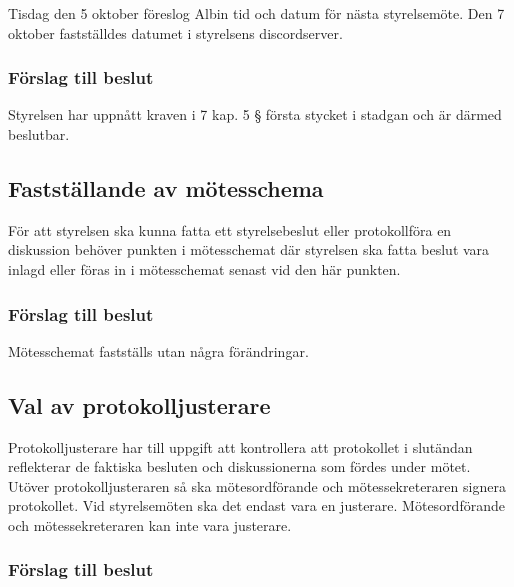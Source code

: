 \documentclass[protokoll]{dvd}
\begin{document}
Tisdag den 5 oktober föreslog Albin tid och datum för nästa styrelsemöte.
Den 7 oktober fastställdes datumet i styrelsens discordserver.

\subsubsection*{Förslag till beslut}

\begin{attsatser}
    \item Styrelsen har uppnått kraven i 7 kap. 5 § första stycket i stadgan och är därmed beslutbar.
\end{attsatser}




\subsection{Fastställande av mötesschema}

För att styrelsen ska kunna fatta ett styrelsebeslut eller protokollföra en diskussion behöver punkten i mötesschemat där styrelsen ska fatta beslut vara inlagd eller föras in i mötesschemat senast vid den här punkten.

\subsubsection*{Förslag till beslut}

\begin{attsatser}
    \item Mötesschemat fastställs utan några förändringar.
\end{attsatser}





\subsection{Val av protokolljusterare}

Protokolljusterare har till uppgift att kontrollera att protokollet i slutändan reflekterar de faktiska besluten och diskussionerna som fördes under mötet.
Utöver protokolljusteraren så ska mötesordförande och mötessekreteraren signera protokollet.
Vid styrelsemöten ska det endast vara en justerare.
Mötesordförande och mötessekreteraren kan inte vara justerare.

\subsubsection*{Förslag till beslut}
\end{document}
